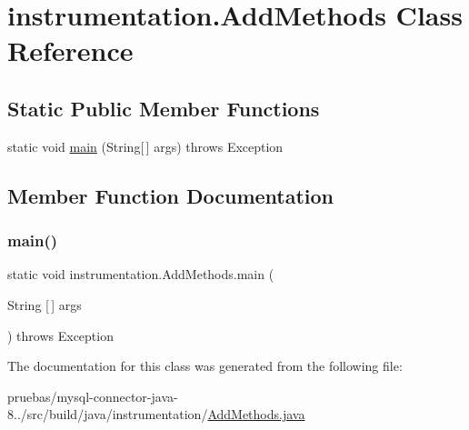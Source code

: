 \hypertarget{classinstrumentation_1_1_add_methods}{}\section{instrumentation.\+Add\+Methods Class Reference}
\label{classinstrumentation_1_1_add_methods}
\subsection*{Static Public Member Functions}
\begin{DoxyCompactItemize}
\item 
static void \mbox{\hyperlink{classinstrumentation_1_1_add_methods_a8e79a5b286ede3d86bc53179f52dbf55}{main}} (String\mbox{[}$\,$\mbox{]} args)  throws Exception 
\end{DoxyCompactItemize}


\subsection{Member Function Documentation}
\mbox{\label{classinstrumentation_1_1_add_methods_a8e79a5b286ede3d86bc53179f52dbf55}} 
\subsubsection{\texorpdfstring{main()}{main()}}
{\footnotesize\ttfamily static void instrumentation.\+Add\+Methods.\+main (\begin{DoxyParamCaption}\item[{String \mbox{[}$\,$\mbox{]}}]{args }\end{DoxyParamCaption}) throws Exception\hspace{0.3cm}{\ttfamily [static]}}



The documentation for this class was generated from the following file\+:\begin{DoxyCompactItemize}
\item 
pruebas/mysql-\/connector-\/java-\/8../src/build/java/instrumentation/\mbox{\hyperlink{_add_methods_8java}{Add\+Methods.\+java}}\end{DoxyCompactItemize}
